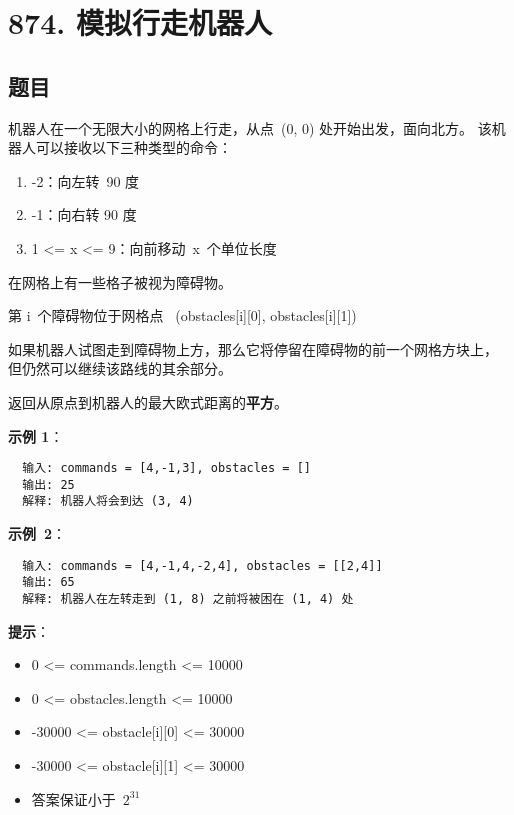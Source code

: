\newpage
\section{874. 模拟行走机器人}
\label{leetcode:874}

\subsection{题目}

机器人在一个无限大小的网格上行走，从点 (0, 0) 处开始出发，面向北方。
该机器人可以接收以下三种类型的命令：

\begin{enumerate}
  \item -2：向左转 90 度
  \item -1：向右转 90 度
  \item 1 <= x <= 9：向前移动 x 个单位长度
\end{enumerate}

在网格上有一些格子被视为障碍物。

第 i 个障碍物位于网格点  (obstacles[i][0], obstacles[i][1])

如果机器人试图走到障碍物上方，那么它将停留在障碍物的前一个网格方块上，
但仍然可以继续该路线的其余部分。

返回从原点到机器人的最大欧式距离的\textbf{平方}。

\textbf{示例 1}：

\begin{verbatim}
  输入: commands = [4,-1,3], obstacles = []
  输出: 25
  解释: 机器人将会到达 (3, 4)
\end{verbatim}

\textbf{示例 2}：

\begin{verbatim}
  输入: commands = [4,-1,4,-2,4], obstacles = [[2,4]]
  输出: 65
  解释: 机器人在左转走到 (1, 8) 之前将被困在 (1, 4) 处
\end{verbatim}

\textbf{提示}：

\begin{itemize}
  \item 0 <= commands.length <= 10000
  \item 0 <= obstacles.length <= 10000
  \item -30000 <= obstacle[i][0] <= 30000
  \item -30000 <= obstacle[i][1] <= 30000
  \item 答案保证小于 $2^{31}$
\end{itemize}

